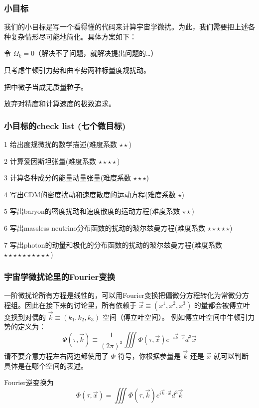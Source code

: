 \documentclass[CJK,13pt]{beamer}
\begin{document}
  \begin{frame}
    \frametitle{小目标}
    我们的小目标是写一个看得懂的代码来计算宇宙学微扰。为此，我们需要把上述各种复杂情形尽可能地简化。具体方案如下：

    
    \bitem
  \item{令 $\Omega_k=0$（解决不了问题，就解决提出问题的…）}
  \item{只考虑牛顿引力势和曲率势两种标量度规扰动。}    
  \item{把中微子当成无质量粒子。}    
  \item{放弃对精度和计算速度的极致追求。}
    \eitem

    
  \end{frame}


  \begin{frame}
    \frametitle{小目标的check list (七个微目标)}
    \bitem
  \item[1]{给出度规微扰的数学描述(难度系数 $\star\star$)}
  \item[2]{计算爱因斯坦张量(难度系数 $\star\star\star\star$)}
  \item[3]{计算各种成分的能量动量张量(难度系数 $\star\star\star$)}    
  \item[4]{写出CDM的密度扰动和速度散度的运动方程(难度系数 $\star$)}
  \item[5]{写出baryon的密度扰动和速度散度的运动方程(难度系数 $\star\star$)}        
  \item[6]{写出massless neutrino分布函数的扰动的玻尔兹曼方程(难度系数 $\star\star\star\star\star$)}
  \item[7]{写出photon的动量和极化的分布函数的扰动的玻尔兹曼方程(难度系数 $\star\star\star\star\star\star\star\star\star\star$)}    
    \eitem
  \end{frame}


 \begin{frame}
   \frametitle{宇宙学微扰论里的Fourier变换}
    一阶微扰论所有方程是线性的，可以用Fourier变换把偏微分方程转化为常微分方程组。因此在接下来的讨论里，所有依赖于 $\vec{x} \equiv (x^1,x^2,x^3)$ 的量都会被傅立叶变换到对偶的 $\vec{k}\equiv (k_1, k_2, k_3)$ 空间（傅立叶空间）。
    例如傅立叶空间中牛顿引力势的定义为：
    $$\Phi(\tau, \vec{k})\equiv \frac{1}{(2\pi)^3}\iiint \Phi(\tau, \vec{x}) e^{-i\vec{k}\cdot\vec{x}}d^3\vec{x}$$
    请不要介意方程左右两边都使用了 $\Phi$ 符号，你根据参量是 $\vec{k}$ 还是 $\vec{x}$ 就可以判断具体是在哪个空间的表述。

    \skipline

    Fourier逆变换为
    $$\Phi(\tau, \vec{x}) = \iiint \Phi(\tau, \vec{k}) e^{i\vec{k}\cdot\vec{x}}d^3\vec{k}$$

  \end{frame}
\end{document}
